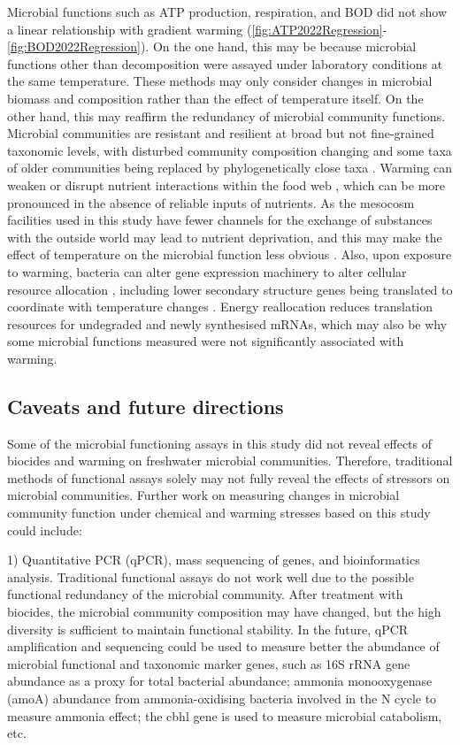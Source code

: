 \documentclass[11pt, a4paper]{article}
\newcommand{\multiref}[2]{\autoref{#1}-\ref{#2}} %
\begin{document}
\begin{spacing}{1.5}
Microbial functions such as ATP production, respiration, and BOD did not show a linear relationship with gradient warming (\multiref{fig:ATP2022Regression}{fig:BOD2022Regression}). On the one hand, this may be because microbial functions other than decomposition were assayed under laboratory conditions at the same temperature. These methods may only consider changes in microbial biomass and composition rather than the effect of temperature itself. On the other hand, this may reaffirm the redundancy of microbial community functions. Microbial communities are resistant and resilient at broad but not fine-grained taxonomic levels, with disturbed community composition changing and some taxa of older communities being replaced by phylogenetically close taxa \citep{allison2008resistance}. Warming can weaken or disrupt nutrient interactions within the food web \citep{winder2004climate}, which can be more pronounced in the absence of reliable inputs of nutrients. As the mesocosm facilities used in this study have fewer channels for the exchange of substances with the outside world may lead to nutrient deprivation, and this may make the effect of temperature on the microbial function less obvious \citep{mulholland2010nutrient}. Also, upon exposure to warming, bacteria can alter gene expression machinery to alter cellular resource allocation \citep{de2017resource}, including lower secondary structure genes being translated to coordinate with temperature changes \citep{bartholomaus2016bacteria}. Energy reallocation reduces translation resources for undegraded and newly synthesised mRNAs, which may also be why some microbial functions measured were not significantly associated with warming.

\subsection{Caveats and future directions}

Some of the microbial functioning assays in this study did not reveal effects of biocides and warming on freshwater microbial communities. Therefore, traditional methods of functional assays solely may not fully reveal the effects of stressors on microbial communities. Further work on measuring changes in microbial community function under chemical and warming stresses based on this study could include:

1)	Quantitative PCR (qPCR), mass sequencing of genes, and bioinformatics analysis. Traditional functional assays do not work well due to the possible functional redundancy of the microbial community. After treatment with biocides, the microbial community composition may have changed, but the high diversity is sufficient to maintain functional stability. In the future, qPCR amplification and sequencing could be used to measure better the abundance of microbial functional and taxonomic marker genes, such as 16S rRNA gene abundance as a proxy for total bacterial abundance; ammonia monooxygenase (amoA) abundance from ammonia-oxidising bacteria involved in the N cycle to measure ammonia effect; the cbhl gene is used to measure microbial catabolism, etc.


\end{spacing}
\end{document}
